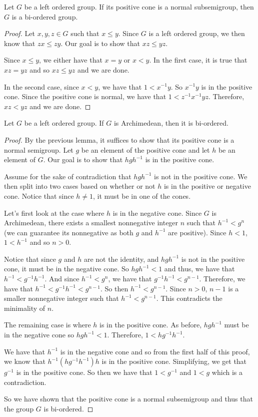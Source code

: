 \begin{lemma}
Let $G$ be a left ordered group. 
If its positive cone is a normal subsemigroup, then $G$ is a bi-ordered group.
\end{lemma}
\begin{proof}
Let $x,y,z \in G$ such that $x \le y$. Since $G$ is a left ordered group, we then know that $zx \le zy$.
Our goal is to show that $xz \le yz$.

Since $x \le y$, we either have that $x = y$ or $x < y$.
In the first case, it is true that $xz = yz$ and so $xz \le yz$ and we are done.

In the second case, since $x < y$, we have that $1 < x^{-1}y$.
So $x^{-1}y$ is in the positive cone. Since the positive cone is normal, we have that
$1 < z^{-1}x^{-1}yz$. Therefore, $xz < yz$ and we are done.
\end{proof}

\begin{lemma}
Let $G$ be a left ordered group.
If $G$ is Archimedean, then it is bi-ordered.
\end{lemma}
\begin{proof}
By the previous lemma, it suffices to show that its positive cone is a normal semigroup.
Let $g$ be an element of the positive cone and let $h$ be an element of $G$.
Our goal is to show that $hgh^{-1}$ is in the positive cone.

Assume for the sake of contradiction that $hgh^{-1}$ is not in the positive cone.
We then split into two cases based on whether or not $h$ is in the positive or negative cone.
Notice that since $h \ne 1$, it must be in one of the cones.

Let's first look at the case where $h$ is in the negative cone.
Since $G$ is Archimedean, there exists a smallest nonnegative integer $n$
such that $h^{-1} < g^n$ (we can guarantee its nonnegative as both $g$ and $h^{-1}$ are positive).
Since $h < 1$, $1 < h^{-1}$ and so $n > 0$.

Notice that since $g$ and $h$ are not the identity,
and $hgh^{-1}$ is not in the positive cone, it must be in the negative cone.
So $hgh^{-1} < 1$ and thus, we have that $h^{-1} < g^{-1}h^{-1}$. And since
$h^{-1} < g^n$, we have that $g^{-1}h^{-1} < g^{n-1}$. Therefore,
we have that $h^{-1} < g^{-1}h^{-1} < g^{n-1}$. So then $h^{-1} < g^{n-1}$.
Since $n > 0$, $n-1$ is a smaller nonnegative integer such that $h^{-1} < g^{n-1}$. 
This contradicts the minimality of $n$.

The remaining case is where $h$ is in the positive cone.
As before, $hgh^{-1}$ must be in the negative cone so
$hgh^{-1} < 1$. Therefore, $1 < hg^{-1}h^{-1}$.

We have that $h^{-1}$ is in the negative cone
and so from the first half of this proof, we know that
$h^{-1}(hg^{-1}h^{-1})h$ is in the positive cone.
Simplifying, we get that $g^{-1}$ is in the positive cone.
So then we have that $1 < g^{-1}$ and $1 < g$ which is a contradiction.

So we have shown that the positive cone is a normal subsemigroup
and thus that the group $G$ is bi-ordered.
\end{proof}

